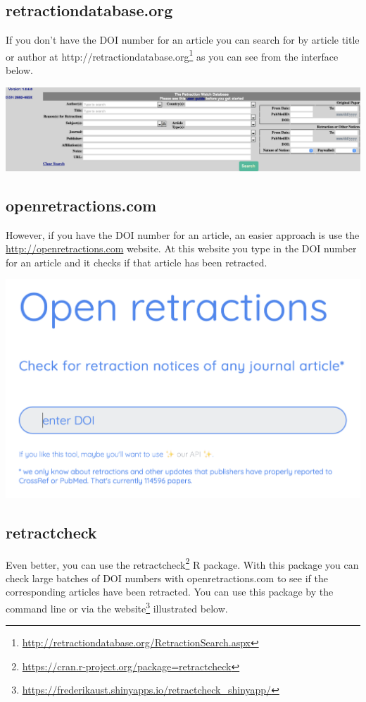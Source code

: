 \documentclass[
]{krantz}
\renewcommand{\href}[2]{#2\footnote{\url{#1}}}
\begin{document}
\hypertarget{retractiondatabase.org}{%
\subsection{retractiondatabase.org}\label{retractiondatabase.org}}

If you don't have the DOI number for an article you can search for by article title or author at \href{http://retractiondatabase.org/RetractionSearch.aspx}{http://retractiondatabase.org} as you can see from the interface below.

\includegraphics[width=1\linewidth]{ch_tools/images/retractiondb}

\hypertarget{openretractions.com}{%
\subsection{openretractions.com}\label{openretractions.com}}

However, if you have the DOI number for an article, an easier approach is use the \url{http://openretractions.com} website. At this website you type in the DOI number for an article and it checks if that article has been retracted.

\includegraphics[width=0.6\linewidth]{ch_tools/images/openretractions}

\hypertarget{retractcheck}{%
\subsection{retractcheck}\label{retractcheck}}

Even better, you can use the \href{https://cran.r-project.org/package=retractcheck}{retractcheck} R package. With this package you can check large batches of DOI numbers with openretractions.com to see if the corresponding articles have been retracted. You can use this package by the command line or via the \href{https://frederikaust.shinyapps.io/retractcheck_shinyapp/}{website} illustrated below.
\end{document}

